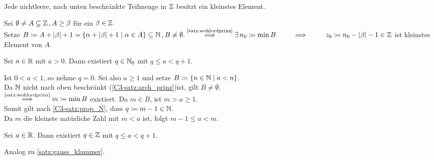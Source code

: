 \documentclass[../ana1.tex]{subfiles}
\begin{document}
\begin{kor}
	Jede nichtleere, nach unten beschränkte Teilmenge in \(\mathbb{Z} \) besitzt ein kleinstes Element.
\end{kor}
\begin{bew}
	Sei \(\emptyset \neq A \subsetneq \mathbb{Z} \operatorname{,} A \geq \beta \) für ein \( \beta \in\mathbb{Z} \) \\
	Setze \(B \coloneqq A + \abs{\beta} + 1 = \set{\alpha + \abs{\beta} + 1 \; \vert \; \alpha \in A} \subseteq \N \ko B \neq \emptyset. \\
	\overset{\text{\autoref{satz:wohlordprinz}}}{\implies} \exists \, n_0 \coloneqq \min B\\
	\overset{\phantom{\text{\autoref{satz:wohlordprinz}}}}{\implies} z_0 \coloneqq n_0 - \abs{\beta} - 1 \in \Z \) ist kleinstes Element von \(A \).
\end{bew}

\begin{lem}\label{satz:gauss_klammer}
	Sei \( a \in\mathbb{R} \) mit \( a > 0 \). Dann existiert \(q \in \mathbb{N}_0 \) mit \(q \leq a < q + 1 \).
\end{lem}
\begin{bew}
	Ist \( 0 < a < 1 \), so nehme \( q = 0 \). Sei also \(a \geq 1 \) und setze \(B \coloneqq \{ n \in \mathbb{N} \; \vert \; a < n \} \). \\
	Da \( \mathbb{N} \) nicht nach oben beschränkt (\autoref{C3-satz:arch_prinz})ist, gilt \(B \neq \emptyset \). \\
	\(\overset{\text{\autoref{satz:wohlordprinz}}}{\implies} m \coloneqq \min B \) existiert. Da \(m \in B \), ist \(m > a \geq 1 \). \\
	Somit gilt nach \autoref{C3-satz:prop_N}, dass \(q\coloneqq m-1\in\mathbb{N} \).\\
	Da \( m \) die kleinste natürliche Zahl mit \(m < a \) ist, folgt \(m - 1 \leq a < m \).
\end{bew}

\begin{bem}
	Sei \(a \in \mathbb{R} \). Dann existiert \(q \in \mathbb{Z} \) mit \(q \leq a < q + 1 \).
\end{bem}
\begin{bew}
	Analog zu \autoref{satz:gauss_klammer}.
\end{bew}
\end{document}
